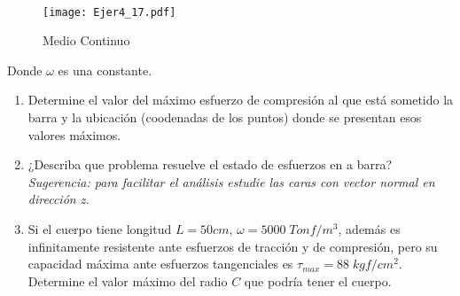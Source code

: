 \documentclass[../notas medios.tex]{subfiles}
\begin{document}
\begin{enumerate}
\begin{equation}
\begin{aligned}
\end{aligned}
\label{trans}
\end{equation}
%
\begin{figure}[H]
	\centering
	\texttt{[image: Ejer4\_17.pdf]} 
	\caption{Medio Continuo}
	\label{barra}
\end{figure}
%
Donde $\omega$ es una constante.\\
\begin{enumerate}
	\item  Determine el valor del m\'aximo esfuerzo de compresi\'on al que está sometido la barra y la ubicaci\'on (coodenadas de los puntos) donde se presentan esos valores máximos. 
    \item ¿Describa que problema resuelve el estado de esfuerzos en a barra?  \textsl{Sugerencia: para facilitar el an\'alisis estudie las caras con vector normal en direcci\'on z.} 
	\item Si el cuerpo tiene longitud $L = 50 cm$, $\omega = 5000 \; Tonf / m^3$, adem\'as es infinitamente resistente ante esfuerzos de tracci\'on y de compresi\'on, pero su capacidad m\'axima ante esfuerzos tangenciales es  $ \tau_{max} = 88 \; kgf/cm^2$.  Determine el valor m\'aximo del radio $C$ que podr\'ia tener el cuerpo. 
\end{enumerate}


\end{enumerate}
\end{document}
